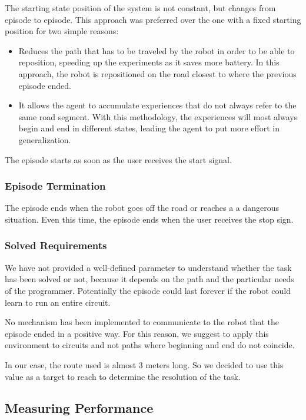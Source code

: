 The starting state position of the system is not constant, but changes from episode to episode.
This approach was preferred over the one with a fixed starting position for two simple reasons:
\begin{itemize}
	\item Reduces the path that has to be traveled by the robot in order to be able to reposition, speeding up the experiments as it saves more battery.
	      In this approach, the robot is repositioned on the road closest to where the previous episode ended.
	\item It allows the agent to accumulate experiences that do not always refer to the same road segment.
	      With this methodology, the experiences will most always begin and end in different states, leading the agent to put more effort in generalization.
\end{itemize}

The episode starts as soon as the user receives the start signal.

\subsubsection{Episode Termination}

The episode ends when the robot goes off the road or reaches a a dangerous situation.
Even this time, the episode ends when the user receives the stop sign.

\subsubsection{Solved Requirements}

We have not provided a well-defined parameter to understand whether the task has been solved or not, because it depends on the path and the particular needs of the programmer.
Potentially the episode could last forever if the robot could learn to run an entire circuit.

No mechanism has been implemented to communicate to the robot that the episode ended in a positive way.
For this reason, we suggest to apply this environment to circuits and not paths where beginning and end do not coincide.

In our case, the route used is almost 3 meters long.
So we decided to use this value as a target to reach to determine the resolution of the task.

\subsection{Measuring Performance}

